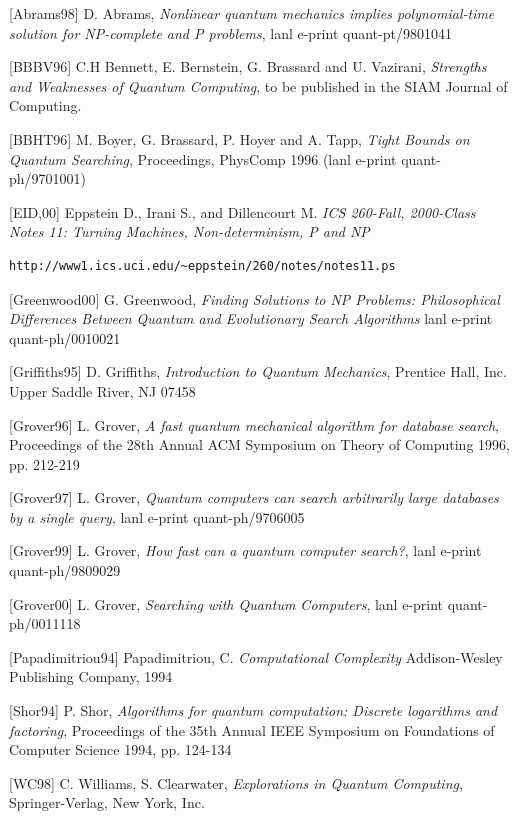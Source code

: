 \documentclass[]{article}
\begin{document}
\begin{description}

\item{[Abrams98]}
D. Abrams, \emph{Nonlinear quantum mechanics implies polynomial-time
solution for NP-complete and P problems}, lanl e-print
quant-pt/9801041

\item{[BBBV96]}
C.H Bennett, E. Bernstein, G. Brassard and U. Vazirani, \emph{Strengths
and Weaknesses of Quantum Computing}, to be published in the SIAM
Journal of Computing.

\item{[BBHT96]}
M. Boyer, G. Brassard, P. Hoyer and A. Tapp, \emph{Tight Bounds on
Quantum Searching}, Proceedings, PhysComp 1996 (lanl e-print
quant-ph/9701001)

\item{[EID,00]}
Eppstein D., Irani S., and Dillencourt M. \emph{ICS 260-Fall,
2000-Class Notes 11: Turning Machines, Non-determinism, P and NP}
\begin{verbatim}http://www1.ics.uci.edu/~eppstein/260/notes/notes11.ps \end{verbatim}

\item{[Greenwood00]}
G. Greenwood, \emph{Finding Solutions to NP Problems: Philosophical
Differences Between Quantum and Evolutionary Search Algorithms} lanl
e-print quant-ph/0010021

\item{[Griffiths95]}
D. Griffiths, \emph{Introduction to Quantum Mechanics}, Prentice Hall,
Inc.  Upper Saddle River, NJ 07458

\item{[Grover96]}
L. Grover, \emph{A fast quantum mechanical algorithm for database
search}, Proceedings of the 28th Annual ACM Symposium on Theory of
Computing 1996, pp. 212-219

\item{[Grover97]}
L. Grover, \emph{Quantum computers can search arbitrarily large
databases by a single query}, lanl e-print quant-ph/9706005

\item{[Grover99]}
L. Grover, \emph{How fast can a quantum computer search?}, lanl
e-print quant-ph/9809029

\item{[Grover00]}
L. Grover, \emph{Searching with Quantum Computers}, lanl e-print
quant-ph/0011118

\item{[Papadimitriou94]} 
Papadimitriou, C. \emph{Computational Complexity} Addison-Wesley
Publishing Company, 1994

\item{[Shor94]}
P. Shor, \emph{Algorithms for quantum computation: Discrete logarithms
and factoring}, Proceedings of the 35th Annual IEEE Symposium on
Foundations of Computer Science 1994, pp. 124-134

\item{[WC98]}
C. Williams, S. Clearwater, \emph{Explorations in Quantum Computing},
Springer-Verlag, New York, Inc.

\end{description}
\end{document}
